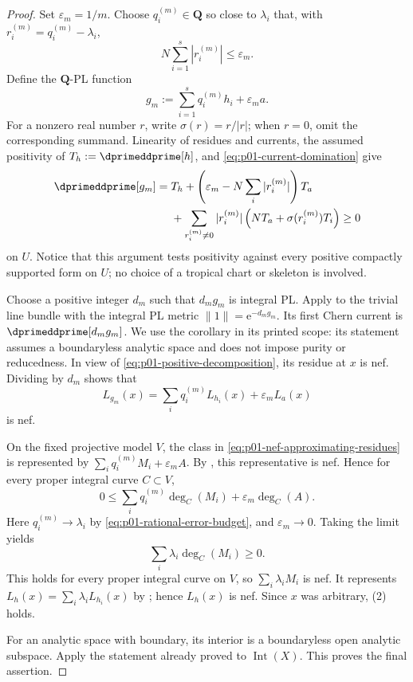 \begin{proof}
Set $\varepsilon_m=1/m$.  Choose $q_i^{(m)}\in\mathbf Q$ so close to
$\lambda_i$ that, with $r_i^{(m)}=q_i^{(m)}-\lambda_i$,
\begin{equation}
\label{eq:p01-rational-error-budget}
                    N\sum_{i=1}^{s}|r_i^{(m)}|\leq\varepsilon_m.
\end{equation}
Define the $\mathbf Q$-PL function
\begin{equation}
\label{eq:p01-rational-positive-approximants}
                       g_m:=\sum_{i=1}^{s}q_i^{(m)}h_i
                                  +\varepsilon_m a.
\end{equation}
For a nonzero real number $r$, write $\sigma(r)=r/|r|$; when $r=0$, omit
the corresponding summand.  Linearity of residues and currents, the
assumed positivity of $T_h:=\dprimeddprime[h]$, and
\eqref{eq:p01-current-domination} give
\begin{align}
\label{eq:p01-positive-decomposition}
 \dprimeddprime[g_m]
  ={}&T_h
    +\left(\varepsilon_m-N\sum_i|r_i^{(m)}|\right)T_a \\
   &+\sum_{r_i^{(m)}\ne0}|r_i^{(m)}|
       \left(NT_a+\sigma(r_i^{(m)})T_i\right)\geq0
\end{align}
on $U$.  Notice that this argument tests positivity against every positive
compactly supported form on $U$; no choice of a tropical chart or skeleton
is involved.

Choose a positive integer $d_m$ such that $d_mg_m$ is integral PL.  Apply
\cite[Corollary~18.8.8]{CLD25} to the trivial line bundle with the integral
PL metric $\lVert1\rVert=\mathrm e^{-d_mg_m}$.  Its first Chern current is
$\dprimeddprime[d_mg_m]$.  We use the corollary in its printed scope: its
statement assumes a boundaryless analytic space and does not impose purity
or reducedness.  In view of
\eqref{eq:p01-positive-decomposition}, its residue at $x$ is nef.  Dividing
by $d_m$ shows that
\begin{equation}
\label{eq:p01-nef-approximating-residues}
             L_{g_m}(x)=\sum_iq_i^{(m)}L_{h_i}(x)
                              +\varepsilon_mL_a(x)
\end{equation}
is nef.

On the fixed projective model $V$, the class in
\eqref{eq:p01-nef-approximating-residues} is represented by
$\sum_iq_i^{(m)}M_i+\varepsilon_mA$.  By
\cite[Lemma~6.11]{GJR26}, this representative is nef.  Hence for every
proper integral curve $C\subset V$,
\[
  0\leq
  \sum_iq_i^{(m)}\deg_C(M_i)+\varepsilon_m\deg_C(A).
\]
Here $q_i^{(m)}\to\lambda_i$ by
\eqref{eq:p01-rational-error-budget}, and $\varepsilon_m\to0$.  Taking the
limit yields
\[
                       \sum_i\lambda_i\deg_C(M_i)\geq0.
\]
This holds for every proper integral curve on $V$, so
$\sum_i\lambda_iM_i$ is nef.  It represents
$L_h(x)=\sum_i\lambda_iL_{h_i}(x)$ by
\cite[Lemma~6.18]{GJR26}; hence $L_h(x)$ is nef.  Since $x$ was arbitrary,
(2) holds.

For an analytic space with boundary, its interior is a boundaryless open
analytic subspace.  Apply the statement already proved to
$\operatorname{Int}(X)$.  This proves the final assertion.
\end{proof}
